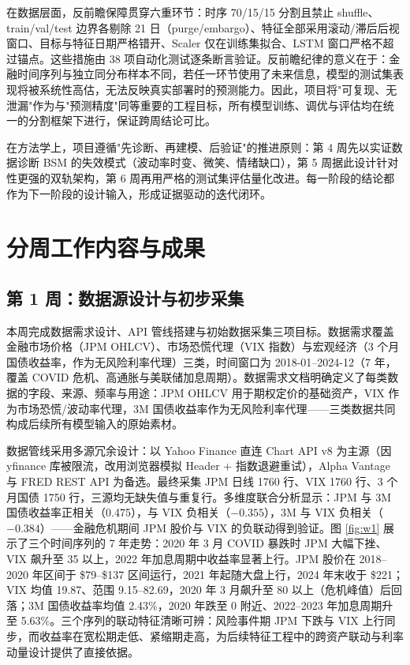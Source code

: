 \documentclass[11pt,a4paper]{article}
\begin{document}
在数据层面，反前瞻保障贯穿六重环节：时序 70/15/15 分割且禁止 shuffle、train/val/test 边界各剔除 21 日（purge/embargo）、特征全部采用滚动/滞后后视窗口、目标与特征日期严格错开、Scaler 仅在训练集拟合、LSTM 窗口严格不超过锚点。这些措施由 38 项自动化测试逐条断言验证。反前瞻纪律的意义在于：金融时间序列与独立同分布样本不同，若任一环节使用了未来信息，模型的测试集表现将被系统性高估，无法反映真实部署时的预测能力。因此，项目将"可复现、无泄漏"作为与"预测精度"同等重要的工程目标，所有模型训练、调优与评估均在统一的分割框架下进行，保证跨周结论可比。

在方法学上，项目遵循"先诊断、再建模、后验证"的推进原则：第 4 周先以实证数据诊断 BSM 的失效模式（波动率时变、微笑、情绪缺口），第 5 周据此设计针对性更强的双轨架构，第 6 周再用严格的测试集评估量化改进。每一阶段的结论都作为下一阶段的设计输入，形成证据驱动的迭代闭环。

\section{分周工作内容与成果}

\subsection{第 1 周：数据源设计与初步采集}

本周完成数据需求设计、API 管线搭建与初始数据采集三项目标。数据需求覆盖金融市场价格（JPM OHLCV）、市场恐慌代理（VIX 指数）与宏观经济（3 个月国债收益率，作为无风险利率代理）三类，时间窗口为 2018-01--2024-12（7 年，覆盖 COVID 危机、高通胀与美联储加息周期）。数据需求文档明确定义了每类数据的字段、来源、频率与用途：JPM OHLCV 用于期权定价的基础资产，VIX 作为市场恐慌/波动率代理，3M 国债收益率作为无风险利率代理——三类数据共同构成后续所有模型输入的原始素材。

数据管线采用多源冗余设计：以 Yahoo Finance 直连 Chart API v8 为主源（因 yfinance 库被限流，改用浏览器模拟 Header + 指数退避重试），Alpha Vantage 与 FRED REST API 为备选。最终采集 JPM 日线 1760 行、VIX 1760 行、3 个月国债 1750 行，三源均无缺失值与重复行。多维度联合分析显示：JPM 与 3M 国债收益率正相关（0.475），与 VIX 负相关（$-0.355$），3M 与 VIX 负相关（$-0.384$）——金融危机期间 JPM 股价与 VIX 的负联动得到验证。图 \ref{fig:w1} 展示了三个时间序列的 7 年走势：2020 年 3 月 COVID 暴跌时 JPM 大幅下挫、VIX 飙升至 35 以上，2022 年加息周期中收益率显著上行。JPM 股价在 2018--2020 年区间于 \$79--\$137 区间运行，2021 年起随大盘上行，2024 年末收于 \$221；VIX 均值 19.87、范围 9.15--82.69，2020 年 3 月飙升至 80 以上（危机峰值）后回落；3M 国债收益率均值 2.43\%，2020 年跌至 0 附近、2022--2023 年加息周期升至 5.63\%。三个序列的联动特征清晰可辨：风险事件期 JPM 下跌与 VIX 上行同步，而收益率在宽松期走低、紧缩期走高，为后续特征工程中的跨资产联动与利率动量设计提供了直接依据。
\end{document}
